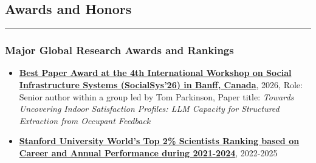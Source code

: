 \documentclass[10pt,a4paper]{article}
\begin{document}
\begin{small}
\begin{itemize}


\end{itemize}









\subsection*{Awards and Honors}
\hrule
\vspace{0.2cm}

\subsubsection*{Major Global Research Awards and Rankings}

\begin{itemize}
  \item \textbf{\href{https://www.dropbox.com/scl/fi/n1ys28ftexukzlk58kjlm/SocialSys-BestPaperAward.jpeg?rlkey=1s6q5z9tllfwdn24c5mldw8wy&st=ui3e2q7q&dl=0}{Best Paper Award at the 4th International Workshop on Social Infrastructure Systems (SocialSys’26) in Banff, Canada}}, 2026, Role: Senior author within a group led by Tom Parkinson, Paper title: \emph{Towards Uncovering Indoor Satisfaction Profiles: LLM Capacity for Structured Extraction from Occupant Feedback}
  \item \textbf{\href{https://elsevier.digitalcommonsdata.com/datasets/btchxktzyw/8}{Stanford University World’s Top 2\% Scientists Ranking based on Career and Annual Performance during 2021-2024}}, 2022-2025 %


\end{itemize}
\end{small}
\end{document}
